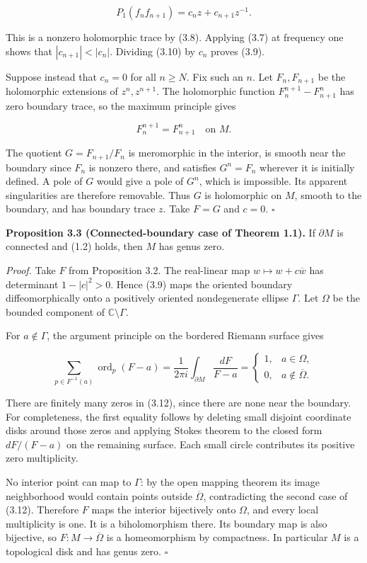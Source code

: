\documentclass[11pt]{article}
\begin{document}
\[
P_1(f_nf_{n+1})=c_nz+c_{n+1}z^{-1}.
\tag{3.10}
\]

This is a nonzero holomorphic trace by (3.8). Applying (3.7) at
frequency one shows that \(|c_{n+1}|<|c_n|\). Dividing (3.10) by \(c_n\)
proves (3.9).

Suppose instead that \(c_n=0\) for all \(n\geq N\). Fix such an \(n\).
Let \(F_n,F_{n+1}\) be the holomorphic extensions of \(z^n,z^{n+1}\).
The holomorphic function \(F_n^{n+1}-F_{n+1}^n\) has zero boundary
trace, so the maximum principle gives

\[
F_n^{n+1}=F_{n+1}^n\quad\text{on }M.
\tag{3.11}
\]

The quotient \(G=F_{n+1}/F_n\) is meromorphic in the interior, is smooth
near the boundary since \(F_n\) is nonzero there, and satisfies
\(G^n=F_n\) wherever it is initially defined. A pole of \(G\) would give
a pole of \(G^n\), which is impossible. Its apparent singularities are
therefore removable. Thus \(G\) is holomorphic on \(M\), smooth to the
boundary, and has boundary trace \(z\). Take \(F=G\) and \(c=0\).
\(\square\)

\textbf{Proposition 3.3 (Connected-boundary case of Theorem 1.1).} If
\(\partial M\) is connected and (1.2) holds, then \(M\) has genus zero.

\emph{Proof.} Take \(F\) from Proposition 3.2. The real-linear map
\(w\mapsto w+c\overline w\) has determinant \(1-|c|^2>0\). Hence (3.9)
maps the oriented boundary diffeomorphically onto a positively oriented
nondegenerate ellipse \(\Gamma\). Let \(\Omega\) be the bounded
component of \(\mathbb C\setminus\Gamma\).

For \(a\notin\Gamma\), the argument principle on the bordered Riemann
surface gives

\[
\sum_{p\in F^{-1}(a)}\operatorname{ord}_p(F-a)
=\frac{1}{2\pi i}\int_{\partial M}\frac{dF}{F-a}
=\begin{cases}1,&a\in\Omega,\\0,&a\notin\overline\Omega.\end{cases}
\tag{3.12}
\]

There are finitely many zeros in (3.12), since there are none near the
boundary. For completeness, the first equality follows by deleting small
disjoint coordinate disks around those zeros and applying
Stokes\textquotesingle{} theorem to the closed form \(dF/(F-a)\) on the
remaining surface. Each small circle contributes its positive zero
multiplicity.

No interior point can map to \(\Gamma\): by the open mapping theorem its
image neighborhood would contain points outside \(\overline\Omega\),
contradicting the second case of (3.12). Therefore \(F\) maps the
interior bijectively onto \(\Omega\), and every local multiplicity is
one. It is a biholomorphism there. Its boundary map is also bijective,
so \(F:M\to\overline\Omega\) is a homeomorphism by compactness. In
particular \(M\) is a topological disk and has genus zero. \(\square\)
\end{document}
